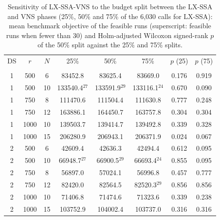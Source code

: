 \begin{table}[!t]
\centering
\caption{Sensitivity of LX-SSA-VNS to the budget split between the LX-SSA and VNS phases (25\%, 50\% and 75\% of the 6,030 calls for LX-SSA): mean benchmark objective of the feasible runs (superscript: feasible runs when fewer than 30) and Holm-adjusted Wilcoxon signed-rank $p$ of the 50\% split against the 25\% and 75\% splits.}
\label{tab:split}
\scriptsize\setlength{\tabcolsep}{2.5pt}
\begin{tabular}{cccccccc}
\toprule
DS & $r$ & $N$ & 25\% & 50\% & 75\% & $p$ (25) & $p$ (75) \\\\
\midrule
1 & 500 & 6 & 83452.8 & 83625.4 & 83669.0 & 0.176 & 0.919 \\
1 & 500 & 10 & 133540.4$^{27}$ & 133591.9$^{29}$ & 133116.1$^{24}$ & 0.670 & 0.090 \\
1 & 750 & 8 & 111470.6 & 111504.4 & 111630.8 & 0.777 & 0.248 \\
1 & 750 & 12 & 163886.1 & 164450.7 & 163757.8 & 0.304 & 0.304 \\
1 & 1000 & 10 & 139503.7 & 139414.7 & 139492.8 & 0.339 & 0.328 \\
1 & 1000 & 15 & 206280.9 & 206943.1 & 206371.9 & 0.024 & 0.067 \\
2 & 500 & 6 & 42609.4 & 42636.3 & 42494.4 & 0.612 & 0.095 \\
2 & 500 & 10 & 66948.7$^{27}$ & 66900.5$^{29}$ & 66693.4$^{24}$ & 0.855 & 0.095 \\
2 & 750 & 8 & 56897.0 & 57024.1 & 56996.8 & 0.457 & 0.777 \\
2 & 750 & 12 & 82420.0 & 82564.5 & 82520.3$^{29}$ & 0.856 & 0.856 \\
2 & 1000 & 10 & 71406.8 & 71474.6 & 71323.6 & 0.339 & 0.238 \\
2 & 1000 & 15 & 103752.9 & 104002.4 & 103737.0 & 0.316 & 0.316 \\
\bottomrule
\end{tabular}
\end{table}

